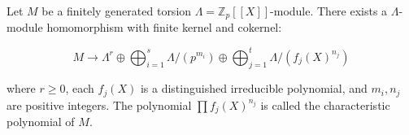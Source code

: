 Let $M$ be a finitely generated torsion $\Lambda = \mathbb{Z}_p[[X]]$-module. There exists a $\Lambda$-module homomorphism with finite kernel and cokernel:

$$M \to \Lambda^r \oplus \bigoplus_{i=1}^{s} \Lambda/(p^{m_i}) \oplus \bigoplus_{j=1}^{t} \Lambda/(f_j(X)^{n_j})$$

where $r \geq 0$, each $f_j(X)$ is a distinguished irreducible polynomial, and $m_i, n_j$ are positive integers. The polynomial $\prod f_j(X)^{n_j}$ is called the characteristic polynomial of $M$.
